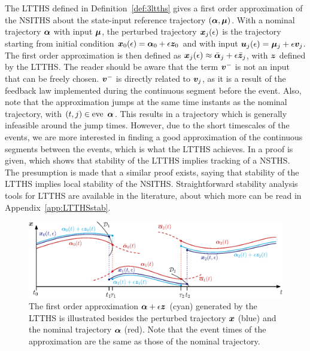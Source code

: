 \documentclass[../DC2017114Bouma.tex]{subfiles}
\begin{document}
The LTTHS defined in Definition~\ref{def:3ltths} gives a first order approximation of the NSITHS about the state-input reference trajectory $(\boldsymbol{\alpha},\boldsymbol{\mu})$. With a nominal trajectory $\boldsymbol{\alpha}$ with input $\boldsymbol{\mu}$, the perturbed trajectory ${\boldsymbol{x}}_j(\epsilon)$ is the trajectory starting from initial condition ${\boldsymbol{x}}_0(\epsilon) = \boldsymbol{\alpha}_0 + \epsilon{\boldsymbol{z}}_0$ and with input ${\boldsymbol{u}}_j(\epsilon) = \boldsymbol{\mu}_j + \epsilon{\boldsymbol{v}}_j$. The first order approximation is then defined as ${\boldsymbol{x}}_j(\epsilon) \approx \bar{\boldsymbol{\alpha}}_j + \epsilon\bar{{\boldsymbol{z}}}_j$, with ${\boldsymbol{z}}$ defined by the LTTHS. The reader should be aware that the term ${\boldsymbol{v}}^-$ is not an input that can be freely chosen. ${\boldsymbol{v}}^-$ is directly related to ${\boldsymbol{v}}_j$, as it is a result of the feedback law implemented during the continuous segment before the event. Also, note that the approximation jumps at the same time instants as the nominal trajectory, with $(t,j) \in \eve\ \alphab$. This results in a trajectory which is generally infeasible around the jump times. However, due to the short timescales of the events, we are more interested in finding a good approximation of the continuous segments between the events, which is what the LTTHS achieves. In \cite{Rijnen2017} a proof is given, which shows that stability of the LTTHS implies tracking of a NSTHS. The presumption is made that a similar proof exists, saying that stability of the LTTHS implies local stability of the NSITHS. Straightforward stability analysis tools for LTTHS are available in the literature, about which more can be read in Appendix~\ref{app:LTTHSstab}.
\begin{figure}[h]
\centering
\includegraphics[width=.95\textwidth]{refspreadapprox.eps}\caption{The first order approximation $\boldsymbol{\alpha} + \epsilon{\boldsymbol{z}}$ (cyan) generated by the LTTHS is illustrated besides the perturbed trajectory ${\boldsymbol{x}}$ (blue) and the nominal trajectory $\boldsymbol{\alpha}$ (red). Note that the event times of the approximation are the same as those of the nominal trajectory.} \label{fig:3refspreadapprox}
\end{figure}
\end{document}
